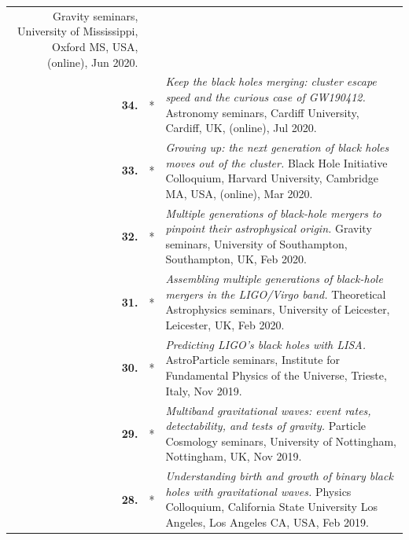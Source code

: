 {\begin{longtable}{rp{0.3cm}p{15.8cm}}
\newline{}
Gravity seminars, University of Mississippi, Oxford MS, USA, (online), Jun 2020.
\vspace{0.05cm}\\
%
\textbf{34.} & * & \textit{Keep the black holes merging: cluster escape speed and the curious case of GW190412.}
\newline{}
Astronomy seminars, Cardiff University, Cardiff, UK, (online), Jul 2020.
\vspace{0.05cm}\\
%
\textbf{33.} & * & \textit{Growing up: the next generation of black holes moves out of the cluster.}
\newline{}
Black Hole Initiative Colloquium, Harvard University, Cambridge MA, USA, (online), Mar 2020.
\vspace{0.05cm}\\
%
\textbf{32.} & * & \textit{Multiple generations of black-hole mergers to pinpoint their astrophysical origin.}
\newline{}
Gravity seminars, University of Southampton, Southampton, UK, Feb 2020.
\vspace{0.05cm}\\
%
\textbf{31.} & * & \textit{Assembling multiple generations of black-hole mergers in the LIGO/Virgo band.}
\newline{}
Theoretical Astrophysics seminars, University of Leicester, Leicester, UK, Feb 2020.
\vspace{0.05cm}\\
%
\textbf{30.} & * & \textit{Predicting LIGO's black holes with LISA.}
\newline{}
AstroParticle seminars, Institute for Fundamental Physics of the Universe, Trieste, Italy, Nov 2019.
\vspace{0.05cm}\\
%
\textbf{29.} & * & \textit{Multiband gravitational waves: event rates, detectability, and tests of gravity.}
\newline{}
Particle Cosmology seminars, University of Nottingham, Nottingham, UK, Nov 2019.
\vspace{0.05cm}\\
%
\textbf{28.} & * & \textit{Understanding birth and growth of binary black holes with gravitational waves.}
\newline{}
Physics Colloquium, California State University Los Angeles, Los Angeles CA, USA, Feb 2019.
\vspace{0.05cm}\\

\end{longtable}}
